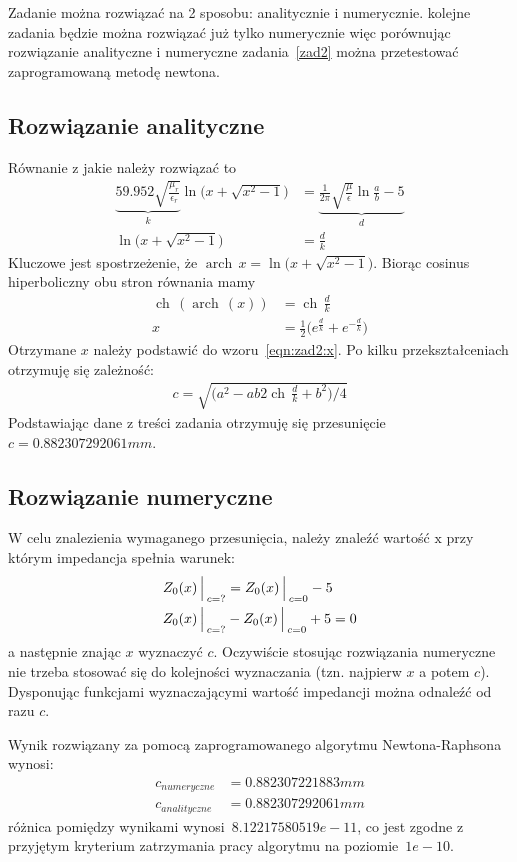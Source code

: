 \documentclass[rep.tex]{subfiles}
\begin{document}
Zadanie można rozwiązać na 2 sposobu: analitycznie i numerycznie.
kolejne zadania będzie można rozwiązać już tylko numerycznie więc porównując rozwiązanie analityczne i numeryczne zadania~\ref{zad2} można przetestować zaprogramowaną metodę newtona.

\subsection{Rozwiązanie analityczne}
Równanie z jakie należy rozwiązać to 
\begin{align}
  \underbrace{59.952 \sqrt{\frac{\mu_r}{\epsilon_r}}}_k\ln\big(x + \sqrt{x^2 - 1}\big) &= \underbrace{\frac{1}{2\pi} \sqrt{\frac{\mu}{\epsilon}}\ln\frac{a}{b} - 5}_d \\
  \ln\big(x + \sqrt{x^2 - 1}\big) &= \frac{d}{k} \label{eqn:zad2:anal}
\end{align}
Kluczowe jest spostrzeżenie, że $\operatorname{arch}\,x = \ln\big(x + \sqrt{x^2 - 1}\big)$.
Biorąc cosinus hiperboliczny obu stron równania mamy
\begin{align}
  \operatorname{ch}\,(\operatorname{arch}\,(x)) &= \operatorname{ch}\,\frac{d}{k} \\
  x &= \frac{1}{2}\big(e^{\frac{d}{k}}+e^{-\frac{d}{k}}\big)
\end{align}
Otrzymane $x$ należy podstawić do wzoru~\ref{eqn:zad2:x}.
Po kilku przekształceniach otrzymuję się zależność:
\begin{align}
  c = \sqrt{\bigg(a^2 - ab2\operatorname{ch}\,\frac{d}{k} + b^2\bigg)\bigg/4}
\end{align}
Podstawiając dane z treści zadania otrzymuję się przesunięcie~$c = 0.882307292061 mm$.

\subsection{Rozwiązanie numeryczne}
W celu znalezienia wymaganego przesunięcia,
należy znaleźć wartość $\mathrm{x}$ przy którym impedancja spełnia warunek:
\begin{align}
  Z_0(x)\Big\arrowvert_{c=?} & = Z_0(x)\Big\arrowvert_{c=0} - 5 \\
  Z_0(x)\Big\arrowvert_{c=?} & - Z_0(x)\Big\arrowvert_{c=0} + 5 = 0
\end{align}
a następnie znając $x$ wyznaczyć $c$.
Oczywiście stosując rozwiązania numeryczne nie trzeba stosować się do kolejności wyznaczania (tzn. najpierw $x$ a potem $c$).
Dysponując funkcjami wyznaczającymi wartość impedancji można odnaleźć od razu $c$.

Wynik rozwiązany za pomocą zaprogramowanego algorytmu Newtona-Raphsona wynosi:
\begin{align}
  c_{numeryczne}  &= 0.882307221883 mm \nonumber \\
  c_{analityczne} &= 0.882307292061 mm \nonumber
\end{align}
różnica pomiędzy wynikami wynosi~$8.12217580519e-11$,
co jest zgodne z przyjętym kryterium zatrzymania pracy algorytmu na poziomie~$1e-10$.
\end{document}
